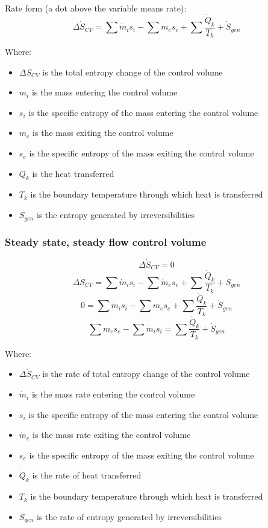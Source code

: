 \documentclass[11pt]{article}
\begin{document}
Rate form (a dot above the variable means rate):
\[\Delta \dot{S}_{CV} = \sum \dot{m}_i s_i - \sum \dot{m}_e s_e + \sum \frac{\dot{Q}_k}{T_k} + \dot{S}_{gen}\]

Where:
\begin{itemize}
\item \(\Delta S_{CV}\) is the total entropy change of the control volume
\item \(m_i\) is the mass entering the control volume
\item \(s_i\) is the specific entropy of the mass entering the control volume
\item \(m_e\) is the mass exiting the control volume
\item \(s_e\) is the specific entropy of the mass exiting the control volume
\item \(Q_k\) is the heat transferred
\item \(T_k\) is the boundary temperature through which heat is transferred
\item \(S_{gen}\) is the entropy generated by irreversibilities
\end{itemize}
\subsubsection{Steady state, steady flow control volume}
\label{sec:org035a0de}
\[\Delta \dot{S}_{CV} = 0\]
\[\Delta \dot{S}_{CV} = \sum \dot{m}_i s_i - \sum \dot{m}_e s_e + \sum \frac{\dot{Q}_k}{T_k} + \dot{S}_{gen}\]
\[0 = \sum \dot{m}_i s_i - \sum \dot{m}_e s_e + \sum \frac{\dot{Q}_k}{T_k} + \dot{S}_{gen}\]
\[\sum \dot{m}_e s_e - \sum \dot{m}_i s_i = \sum \frac{\dot{Q}_k}{T_k} + \dot{S}_{gen}\]

Where:
\begin{itemize}
\item \(\Delta \dot{S}_{CV}\) is the rate of total entropy change of the control volume
\item \(\dot{m}_i\) is the mass rate entering the control volume
\item \(s_i\) is the specific entropy of the mass entering the control volume
\item \(\dot{m}_e\) is the mass rate exiting the control volume
\item \(s_e\) is the specific entropy of the mass exiting the control volume
\item \(\dot{Q}_k\) is the rate of heat transferred
\item \(T_k\) is the boundary temperature through which heat is transferred
\item \(\dot{S}_{gen}\) is the rate of entropy generated by irreversibilities
\end{itemize}
\end{document}
